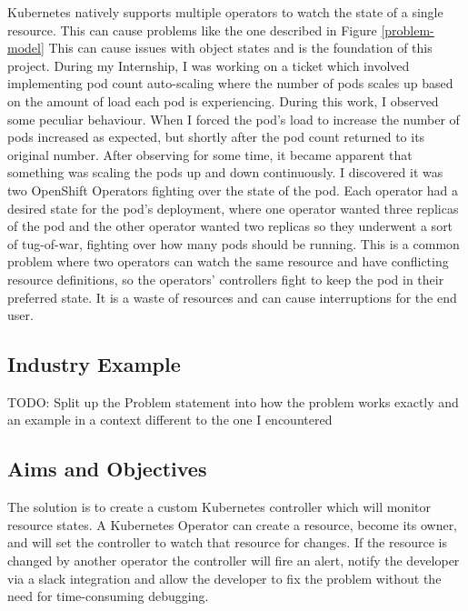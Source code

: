 \documentclass{article}
\begin{document}
Kubernetes natively supports multiple operators to watch the state of a single resource. This can cause problems like the one described in Figure \ref{problem-model}
This can cause issues with object states and is the foundation of this project. During my Internship, I was working on a ticket which involved implementing pod count auto-scaling where the number of pods scales up based on the amount of load each pod is experiencing. 
During this work, I observed some peculiar behaviour. When I forced the pod’s load to increase the number of pods increased as expected, but shortly after the pod count returned to its original number. 
After observing for some time, it became apparent that something was scaling the pods up and down continuously. 
I discovered it was two OpenShift Operators fighting over the state of the pod. 
Each operator had a desired state for the pod’s deployment, where one operator wanted three replicas of the pod and the other operator wanted two replicas so they underwent a sort of tug-of-war, fighting over how many pods should be running. 
This is a common problem where two operators can watch the same resource and have conflicting resource definitions, so the operators' controllers fight to keep the pod in their preferred state. It is a waste of resources and can cause interruptions for the end user.


\subsection{Industry Example}
TODO: Split up the Problem statement into how the problem works exactly and an example in a context different to the one I encountered


\subsection{Aims and Objectives}
The solution is to create a custom Kubernetes controller which will monitor resource states. 
A Kubernetes Operator can create a resource, become its owner, and will set the controller to watch that resource for changes. 
If the resource is changed by another operator the controller will fire an alert, notify the developer via a slack integration and allow the developer to fix the problem without the need for time-consuming debugging. 
\end{document}
